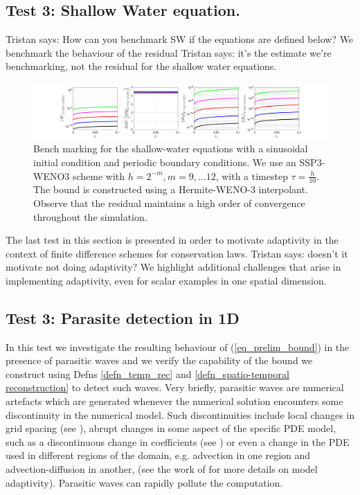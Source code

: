 \documentclass[final]{amsart}
\newcommand{\tristan}[1]{{\color{purple} Tristan says:  #1 }}
\numberwithin{equation}{section}
\begin{document}
\subsection{Test 3:  Shallow Water equation.}
\tristan{How can you benchmark SW if the equations are defined below?}
We benchmark the behaviour of the residual \tristan{it's the estimate
  we're benchmarking, not the residual} for the shallow water
equations.
\begin{figure}[H]	
  \includegraphics[width=\textwidth]{../figures/fig_SHW_RK3_WENO3_rec3_fixed_gsplots_1x5_sin_IC_P3_shw}	
  \caption{\label{fig:SSP3WENO_SHW} Bench marking for the
    shallow-water equations with a sinusoidal initial condition and
    periodic boundary conditions. We use an SSP3-WENO3 scheme with $h
    = 2^{-m}, m = 9,\dots 12$, with a timestep $\tau = \tfrac{h}{10}$.
    The bound is constructed using a Hermite-WENO-3 interpolant.
    Observe that the residual maintains a high order of convergence
    throughout the simulation.}
\end{figure}

The last test in this section is presented in order to motivate
adaptivity in the context of finite difference schemes for
conservation laws. \tristan{doesn't it motivate not doing adaptivity?}
We highlight additional challenges that arise in implementing
adaptivity, even for scalar examples in one spatial dimension.

\subsection{Test 3: Parasite detection in 1D} \label{subsec:parasite}

In this test we investigate the resulting behaviour of
(\ref{eq_prelim_bound}) in the presence of parasitic waves and we
verify the capability of the bound we construct using Defns
\ref{defn_temp_rec} and \ref{defn_spatio-temporal reconstruction} to
detect such waves. Very briefly, parasitic waves are numerical
artefacts which are generated whenever the numerical solution
encounters some discontinuity in the numerical model. Such
discontinuities include local changes in grid spacing (see
\cite{vichnevetsky1981propagation}), abrupt changes in some aspect of
the specific PDE model, such as a discontinuous change in coefficients
(see \cite{trefethen1982group}) or even a change in the PDE used in
different regions of the domain, e.g. advection in one region and
advection-diffusion in another, (see the work of
\cite{giesselmann2017posteriori} for more details on model
adaptivity).  Parasitic waves can rapidly pollute the computation.
\end{document}
